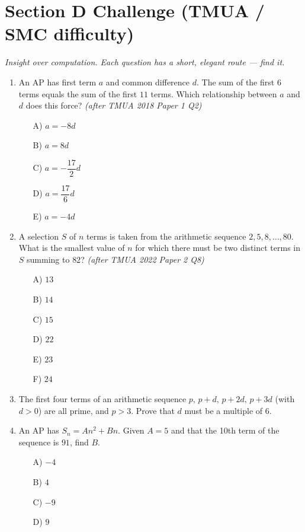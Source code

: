 \documentclass[11pt,a4paper]{article}
\begin{document}
\section*{Section D \quad Challenge \hfill{\normalfont\small(TMUA / SMC difficulty)}}

\noindent\textit{Insight over computation. Each question has a short, elegant route --- find it.}

\begin{enumerate}

\item An AP has first term $a$ and common difference $d$. The sum of the first $6$ terms equals the sum of the first $11$ terms. Which relationship between $a$ and $d$ does this force? \textit{\small(after TMUA 2018 Paper 1 Q2)}
\begin{itemize}
\item[A)] $a=-8d$
\item[B)] $a=8d$
\item[C)] $a=-\dfrac{17}{2}d$
\item[D)] $a=\dfrac{17}{6}d$
\item[E)] $a=-4d$
\end{itemize}

\item A selection $S$ of $n$ terms is taken from the arithmetic sequence $2,5,8,\ldots,80$. What is the smallest value of $n$ for which there must be two distinct terms in $S$ summing to $82$? \textit{\small(after TMUA 2022 Paper 2 Q8)}
\begin{itemize}
\item[A)] $13$
\item[B)] $14$
\item[C)] $15$
\item[D)] $22$
\item[E)] $23$
\item[F)] $24$
\end{itemize}

\item The first four terms of an arithmetic sequence $p,\,p+d,\,p+2d,\,p+3d$ (with $d>0$) are all prime, and $p>3$. Prove that $d$ must be a multiple of $6$.

\item An AP has $S_n=An^2+Bn$. Given $A=5$ and that the 10th term of the sequence is $91$, find $B$.
\begin{itemize}
\item[A)] $-4$
\item[B)] $4$
\item[C)] $-9$
\item[D)] $9$
\end{itemize}


\end{enumerate}
\end{document}
